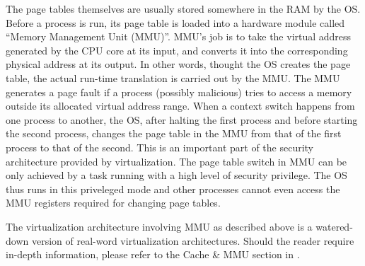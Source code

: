 The page tables themselves are usually stored somewhere in the RAM by the OS. Before a process is run, its page table is loaded into a hardware module called ``Memory Management Unit (MMU)''. MMU's job is to take the virtual address generated by the CPU core at its input, and converts it into the corresponding physical address at its output. In other words, thought the OS creates the page table, the actual run-time translation is carried out by the MMU. The MMU generates a page fault if a process (possibly malicious) tries to access a memory outside its allocated virtual address range. When a context switch happens from one process to another, the OS, after halting the first process and before starting the second process, changes the page table in the MMU from that of the first process to that of the second. This is an important part of the security architecture provided by virtualization. The page table switch in MMU can be only achieved by a task running with a high level of security privilege. The OS thus runs in this priveleged mode and other processes cannot even access the MMU registers required for changing page tables.

The virtualization architecture involving MMU as described above is a watered-down version of real-word virtualization architectures. Should the reader require in-depth information, please refer to the Cache \& MMU section in  .

